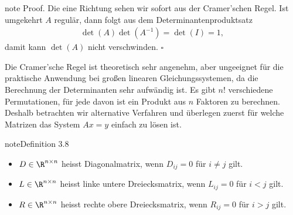 \documentclass[letterpaper,10pt,english]{jupyterBook}
\begin{document}
\begin{sphinxadmonition}{note}
Proof. Die eine Richtung sehen wir sofort aus der Cramer’schen Regel. Ist umgekehrt \(A\) regulär, dann folgt aus dem Determinantenproduktsatz
\begin{equation*}
\begin{split} \det(A) \det(A^{-1}) = \det(I) = 1,\end{split}
\end{equation*}
damit kann \(\det(A)\) nicht verschwinden. \(\square\)
\end{sphinxadmonition}

Die Cramer’sche Regel ist theoretisch sehr angenehm, aber ungeeignet für die praktische Anwendung bei großen linearen Gleichungssystemen, da die Berechnung der Determinanten sehr aufwändig ist. Es gibt \(n!\) verschiedene Permutationen, für jede davon ist ein Produkt aus \(n \) Faktoren zu berechnen. Deshalb betrachten wir alternative Verfahren und überlegen zuerst für welche Matrizen das System \(Ax=y\) einfach zu lösen ist.
\label{vektorraeume/LGS:definition-19}
\begin{sphinxadmonition}{note}{Definition 3.8}


\begin{itemize}
\item {} 
\(D \in \R^{n \times n}\) heisst Diagonalmatrix, wenn \(D_{ij} =0 \) für \(i \neq j\) gilt.

\item {} 
\(L \in \R^{n \times n}\) heisst linke untere Dreiecksmatrix, wenn \(L_{ij} =0 \) für \(i < j\) gilt.

\item {} 
\(R \in \R^{n \times n}\) heisst rechte obere Dreiecksmatrix, wenn \(R_{ij} =0 \) für \(i > j\) gilt.

\end{itemize}
\end{sphinxadmonition}
\end{document}
